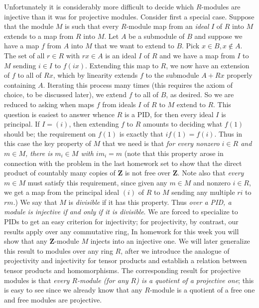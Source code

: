 \documentclass[10pt]{article}
\begin{document}
Unfortunately it is considerably more difficult to decide which
$R$-modules are injective than it was for projective modules. Consider
first a special case. Suppose that the module $M$ is such that every
$R$-module map from an {\sl ideal} $I$ of $R$ into $M$ extends to a map
from $R$ into $M$. Let $A$ be a submodule of $B$ and suppose we have a
map $f$ from $A$ into $M$ that we want to extend to $B$. Pick $x\in
B,x\notin A$. The set of all $r\in R$ with $rx\in A$ is an ideal $I$ of
$R$ and we have a map from $I$ to $M$ sending $i\in I$ to $f(ix)$.
Extending this map to $R$, we now have an extension of $f$ to all of
$Rx$, which by linearity extends $f$ to the submodule $A+Rx$ properly
containing $A$. Iterating this process many times (this requires the
axiom of choice, to be discussed later), we extend $f$ to all of $B$, as
desired. So we are reduced to asking when maps $f$ from ideals $I$ of
$R$ to $M$ extend to $R$. This question is easiest to answer whence $R$
is a PID, for then every ideal $I$ is principal. If $I=(i)$, then
extending $f$ to $R$ amounts to deciding what $f(1)$ should be; the
requirement on $f(1)$ is exactly that $if(1) = f(i)$. Thus in this case
the key property of $M$ that we need is that {\sl for every nonzero
  $i\in R$ and $m\in M$, there is $m_i\in M$ with $im_i = m$} (note that
  this property arose in connection with the problem in the last
  homework set to show that the direct product of countably many copies
  of $\mathbf{Z}$ is not free over $\mathbf{Z}$. Note also that {\sl
    every} $m\in M$ must satisfy this requirement, since given any $m\in
  M$ and nonzero $i\in R$, we get a map from the principal ideal $(i)$
  of $R$ to $M$ sending any multiple $ri$ to $rm$.) We say that $M$ is
  {\sl divisible} if it has this property. Thus {\sl over a PID, a
    module is injective if and only if it is divisible}. We are forced
  to specialize to PIDs to get an easy criterion for injectivity; for
  projectivity, by contrast, our results apply over any commutative
  ring, In homework for this week you will show that any
  $\mathbf{Z}$-module $M$ injects into an injective one. We will later
  generalize this result to modules over any ring $R$, after we
  introduce the analogue of projectivity and injectivity for tensor
  products and establish a relation between tensor products and
  homomorphisms. The corresponding result for projective modules is that
  {\sl every $R$-module (for any $R$) is a quotient of a projective
    one}; this is easy to see since we already know that any $R$-module
  is a quotient of a free one and free modules are projective.
\end{document}
